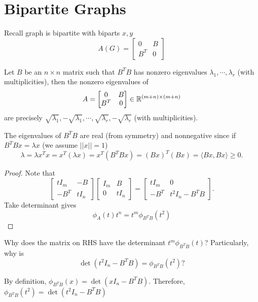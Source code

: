 \section{Bipartite Graphs}
Recall graph is bipartite with biparts \(x,y\) \iff
\[ A(G)=\begin{bmatrix}0 & B \\ B^T & 0\end{bmatrix} \]

\begin{lemma}
Let \(B\) be an \(n\times n\) matrix such that \(B^TB\) has nonzero eigenvalues \(\lambda_1,\cdots,\lambda_r\) (with multiplicities), then the nonzero eigenvalues of 
\[ A=\begin{bmatrix}0 & B \\ B^T & 0\end{bmatrix}\in\mathbb{R}^{(m+n)\times(m+n)} \]
are precisely \( \sqrt{\lambda_1},-\sqrt{\lambda_1},\cdots,\sqrt{\lambda_r},-\sqrt{\lambda_r} \) (with multiplicities).
\end{lemma}
\begin{remark}
The eigenvalues of \(B^TB\) are real (from symmetry) and nonnegative since if \(B^T Bx=\lambda x\) (we assume \(||x||=1\))
\[ \lambda =\lambda x^T x= x^T (\lambda x)= x^T(B^T Bx) =(Bx)^T(Bx)=\langle Bx,Bx\rangle\geq0. \]
\end{remark}
\begin{proof}
Note that
\[ \begin{bmatrix}t I_m & -B \\ -B^T & t I_n\end{bmatrix}\begin{bmatrix} I_m & B \\ 0 & t I_n\end{bmatrix}=\begin{bmatrix}t I_m & 0 \\ -B^T & t^2 I_n-B^TB \end{bmatrix}. \]
Take determinant gives
\[ \phi_A(t) t^n=t^m\phi_{B^TB}(t^2) \]
\end{proof}
\begin{question}
Why does the matrix on RHS have the determinant \(t^m\phi_{B^T B}(t)\)?
Particularly, why is
\[ \det\left(t^2I_n-B^T B\right)=\phi_{B^T B}\left(t^2\right)? \]
\end{question}
\begin{answer}
By definition, $\phi_{B^T B}(x)=\det(x I_n-B^T B)$. Therefore, $\phi_{B^T B}(t^2)=\det(t^2 I_n - B^T B)$
\end{answer}

